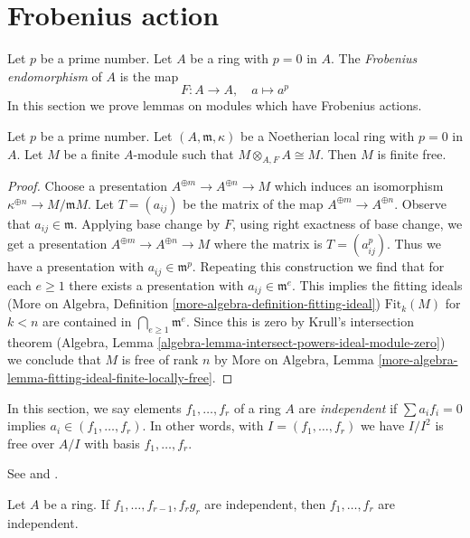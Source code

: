 \section{Frobenius action}
\label{section-frobenius}

\noindent
Let $p$ be a prime number. Let $A$ be a ring with $p = 0$ in $A$.
The {\it Frobenius endomorphism} of $A$ is the map
$$
F : A \longrightarrow A,
\quad
a \longmapsto a^p
$$
In this section we prove lemmas on modules which have
Frobenius actions.

\begin{lemma}
\label{lemma-annihilator-frobenius-module}
Let $p$ be a prime number. Let $(A, \mathfrak m, \kappa)$
be a Noetherian local ring
with $p = 0$ in $A$. Let $M$ be a finite $A$-module
such that $M \otimes_{A, F} A \cong M$. Then $M$ is finite free.
\end{lemma}

\begin{proof}
Choose a presentation $A^{\oplus m} \to A^{\oplus n} \to M$
which induces an isomorphism $\kappa^{\oplus n} \to M/\mathfrak m M$.
Let $T = (a_{ij})$ be the matrix of the map $A^{\oplus m} \to A^{\oplus n}$.
Observe that $a_{ij} \in \mathfrak m$. Applying base change by
$F$, using right exactness of base change, we get a presentation
$A^{\oplus m} \to A^{\oplus n} \to M$ where the matrix is
$T = (a_{ij}^p)$. Thus we have a presentation with
$a_{ij} \in \mathfrak m^p$. Repeating this construction we
find that for each $e \geq 1$ there exists a presentation with
$a_{ij} \in \mathfrak m^e$. This implies the fitting ideals
(More on Algebra, Definition \ref{more-algebra-definition-fitting-ideal})
$\text{Fit}_k(M)$ for $k < n$ are contained in
$\bigcap_{e \geq 1} \mathfrak m^e$. Since this is zero by
Krull's intersection theorem
(Algebra, Lemma \ref{algebra-lemma-intersect-powers-ideal-module-zero})
we conclude that
$M$ is free of rank $n$ by
More on Algebra, Lemma
\ref{more-algebra-lemma-fitting-ideal-finite-locally-free}.
\end{proof}

\noindent
In this section, we say elements $f_1, \ldots, f_r$ of a ring $A$
are {\it independent} if $\sum a_if_i = 0$ implies
$a_i \in (f_1, \ldots, f_r)$. In other words, with $I = (f_1, \ldots, f_r)$
we have $I/I^2$ is free over $A/I$ with basis $f_1, \ldots, f_r$.

\begin{lemma}
\label{lemma-1}
\begin{reference}
See \cite{Lech-inequalities} and \cite[Lemma 1 page 299]{MatCA}.
\end{reference}
Let $A$ be a ring. If $f_1, \ldots, f_{r - 1}, f_rg_r$
are independent, then $f_1, \ldots, f_r$ are independent.
\end{lemma}

